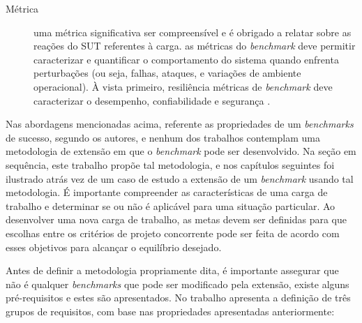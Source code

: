 \begin{description}
	\item[Métrica] uma métrica significativa ser compreensível e é obrigado a relatar sobre as reações do SUT referentes à carga. \cite{Folkerts2013} as métricas do \textit{benchmark} deve permitir caracterizar e quantificar o comportamento do sistema quando enfrenta perturbações (ou seja, falhas, ataques, e variações de ambiente operacional). À vista primeiro, resiliência métricas de \textit{benchmark} deve caracterizar o desempenho, confiabilidade e segurança \cite{Marco2012}.
	
\end{description}

Nas abordagens mencionadas acima, referente as propriedades de um \textit{benchmarks} de sucesso, segundo os autores, e nenhum dos trabalhos contemplam uma metodologia de extensão em que o \textit{benchmark} pode ser desenvolvido. Na seção em sequência, este trabalho propõe tal metodologia, e nos capítulos seguintes foi ilustrado atrás vez de um caso de estudo a extensão de um \textit{benchmark} usando tal metodologia. É importante compreender as características de uma carga de trabalho e determinar se ou não é aplicável para uma situação particular. Ao desenvolver uma nova carga de trabalho, as metas devem ser definidas para que escolhas entre os critérios de projeto concorrente pode ser feita de acordo com esses objetivos para alcançar o equilíbrio desejado. \cite{Kistowski2015}

Antes de definir a metodologia propriamente dita, é importante assegurar que não é qualquer \textit{benchmarks} que pode ser modificado pela extensão, existe alguns pré-requisitos e estes são apresentados. No trabalho \cite{Folkerts2013} apresenta a definição de três grupos de requisitos, com base nas propriedades apresentadas anteriormente:

